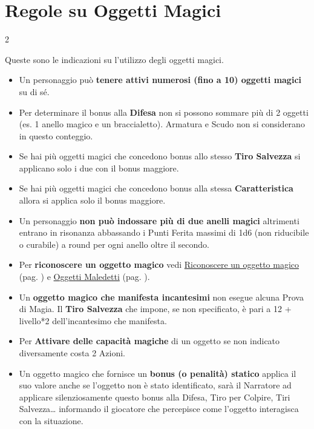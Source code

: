 \section{Regole su Oggetti Magici}\hypertarget{identificareom}{}\label{regoleoggettimagici}\hypertarget{regoleoggettimagici}{}

\begin{multicols}{2}

Queste sono le indicazioni su l'utilizzo degli oggetti magici.

\label{oggetti-magici}
\begin{itemize}[leftmargin=*] \setlength{\itemsep}{0pt}
\item
Un personaggio può \textbf{tenere attivi numerosi (fino a 10) oggetti magici} su di sé.

\item Per determinare il bonus alla \textbf{Difesa} non si possono sommare più di 2 oggetti (es. 1 anello magico e un braccialetto). Armatura e Scudo non si considerano in questo conteggio.
\item
Se hai più oggetti magici che concedono bonus allo stesso \textbf{Tiro Salvezza} si applicano solo i due con il bonus maggiore.
\item
Se hai più oggetti magici che concedono bonus alla stessa \textbf{Caratteristica} allora si applica solo il bonus maggiore.
\item
Un personaggio \textbf{non può indossare più di due anelli magici} altrimenti entrano in risonanza abbassando i Punti Ferita massimi di 1d6 (non riducibile o curabile) a round per ogni anello oltre il secondo.
\item
Per \textbf{riconoscere un oggetto magico} vedi \hyperlink{rinoscereoggettomagico}{Riconoscere un oggetto magico} (pag. \pageref{rinoscereoggettomagico}) e \hyperlink{oggettimaledettiid}{Oggetti Maledetti} (pag. \pageref{oggettimaledettiid}).
\item
Un \textbf{oggetto magico che manifesta incantesimi} non esegue alcuna Prova di Magia. Il \textbf{Tiro Salvezza} che impone, se non specificato, è pari a 12 + livello*2 dell'incantesimo che manifesta.\label{tirosalvezzaincoggetto}
\item
Per \textbf{Attivare delle capacità magiche} di un oggetto se non indicato diversamente  costa 2 Azioni.
\item
Un oggetto magico che fornisce un \textbf{bonus (o penalità) statico} applica il suo valore anche se l'oggetto non è stato identificato, sarà il Narratore ad applicare silenziosamente questo bonus alla Difesa, Tiro per Colpire, Tiri Salvezza… informando il giocatore che percepisce come l'oggetto interagisca con la situazione.

\end{itemize}
\end{multicols}
